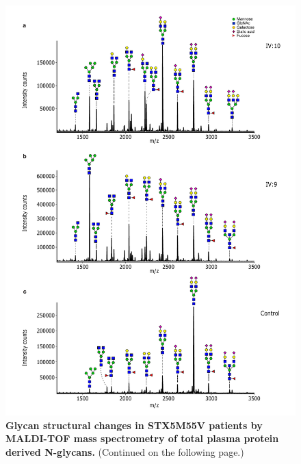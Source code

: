\begin{figure}
    \includegraphics[keepaspectratio=true,width=\textwidth,height=\textheight]{chapters/chapter6/chapter6_SupplementaryFigure3.pdf}
    \caption{\textbf{Glycan structural changes in STX5M55V patients by MALDI-TOF mass spectrometry of total plasma protein derived N-glycans.} (Continued on the following page.) }
    \label{fig:ch6supfig3}
\end{figure}
\begin{figure}[t]
\end{figure}

\clearpage

